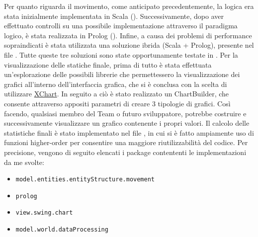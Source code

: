 Per quanto riguarda il movimento, come anticipato precedentemente, la logica era stata inizialmente implementata in Scala (). Successivamente, dopo aver effettuato controlli su una possibile implementazione attraverso il paradigma logico, è stata realizzata in Prolog (). Infine, a causa dei problemi di performance sopraindicati è stata utilizzata una soluzione ibrida (Scala + Prolog), presente nel file . Tutte queste tre soluzioni sono state opportunamente testate in . Per la visualizzazione delle statiche finale, prima di tutto è stata effettuata un'esplorazione delle possibili librerie che permettessero la visualizzazione dei grafici all'interno dell'interfaccia grafica, che si è conclusa con la scelta di utilizzare \hyperlink{https://knowm.org/open-source/xchart/}{XChart}. In seguito a ciò è stato realizzato un ChartBuilder, che consente attraverso appositi parametri di creare 3 tipologie di grafici. Così facendo, qualsiasi membro del Team o futuro sviluppatore, potrebbe costruire e successivamente visualizzare un grafico contenente i propri valori. Il calcolo delle statistiche finali è stato implementato nel file , in cui si è fatto ampiamente uso di funzioni higher-order per consentire una maggiore riutilizzabilità del codice. Per precisione, vengono di seguito elencati i package contententi le implementazioni da me svolte:

\begin{itemize}
    \item \texttt{model.entities.entityStructure.movement}
    \item \texttt{prolog}
    \item \texttt{view.swing.chart}
    \item \texttt{model.world.dataProcessing}
\end{itemize}